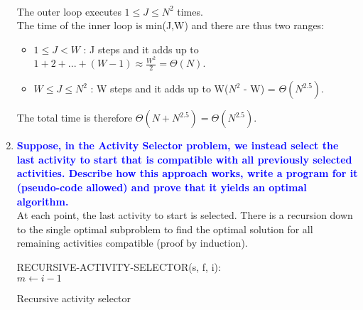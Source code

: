\documentclass[11pt]{article}
\begin{document}
\begin{enumerate}
\begin{algorithm}[H]
    \end{algorithm}
    \\ The outer loop executes $1 \leq J \leq N^2$ times.
    \\ The time of the inner loop is min(J,W) and there are thus two ranges:
    \begin{itemize}
        \item $1 \leq J < W$ : J steps and it adds up to $1 + 2 + ... + (W - 1) \approx \frac{W^2}{2} = \Theta(N)$.
        \item $W \leq J \leq N^2$ : W steps and it adds up to W($N^2$ - W) = $\Theta(N^{2.5})$.
    \end{itemize}
    The total time is therefore $\Theta(N + N^{2.5}) = \Theta(N^{2.5})$.
    
\item  \textbf{\textcolor{blue}{Suppose, in the Activity Selector problem, we
instead select the last activity to start that is compatible with all previously
selected activities. Describe how this approach works, write a program for it 
(pseudo-code allowed) and prove that it yields an optimal algorithm.}}
    \\ At each point, the last activity to start is selected. There is a recursion down to the single optimal subproblem to find the optimal solution for all remaining activities compatible (proof by induction). \\
    \begin{algorithm}[H]
    RECURSIVE-ACTIVITY-SELECTOR(s, f, i): \\
    $m \leftarrow i - 1$ \\
    \caption{Recursive activity selector}
    \end{algorithm}
    

\end{enumerate}
\end{document}
